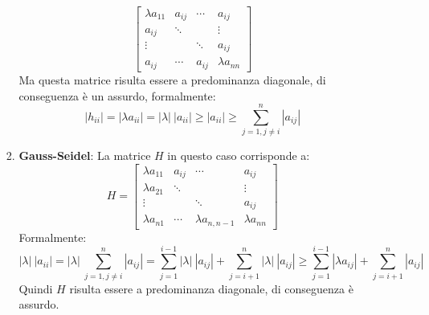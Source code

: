 \documentclass{article}
\begin{document}
\begin{enumerate}
\begin{enumerate}
\begin{enumerate}
\[\begin{bmatrix}
                \lambda a_{11} & a_{ij} & \cdots & a_{ij} \\
                a_{ij} & \ddots & & \vdots \\
                \vdots & & \ddots & a_{ij}\\
                a_{ij} & \cdots & a_{ij} & \lambda a_{nn}
            \end{bmatrix} \]
        Ma questa matrice risulta essere a predominanza diagonale, di conseguenza è un assurdo, formalmente:
        \[ |h_{ii}| = |\lambda a_{ii}| = |\lambda|\:|a_{ii}| \geq |a_{ii}| \geq \sum_{j=1, j \neq i}^{n} |a_{ij}| \]
            \item \textbf{Gauss-Seidel}: La matrice $H$ in questo caso corrisponde a:
            \[ H = \begin{bmatrix}
                \lambda a_{11} & a_{ij} & \cdots & a_{ij} \\
                \lambda a_{21} & \ddots & & \vdots \\
                \vdots & & \ddots & a_{ij}\\
                \lambda a_{n1} & \cdots & \lambda a_{n,n-1} & \lambda a_{nn}
            \end{bmatrix} \]
            Formalmente:
            \[ |\lambda|\:|a_{ii}| = |\lambda| \: \sum_{j=1, j \neq i}^{n} |a_{ij}| = \sum_{j=1}^{i-1} |\lambda| \: |a_{ij}| + \sum_{j=i+1}^{n} |\lambda| \: |a_{ij}| \geq \sum_{j=1}^{i-1} |\lambda a_{ij}| + \sum_{j=i+1}^{n} |a_{ij}| \]
            Quindi $H$ risulta essere a predominanza diagonale, di conseguenza è assurdo.
        \end{enumerate}
    \end{enumerate}
\end{enumerate}

\newpage
\end{document}

